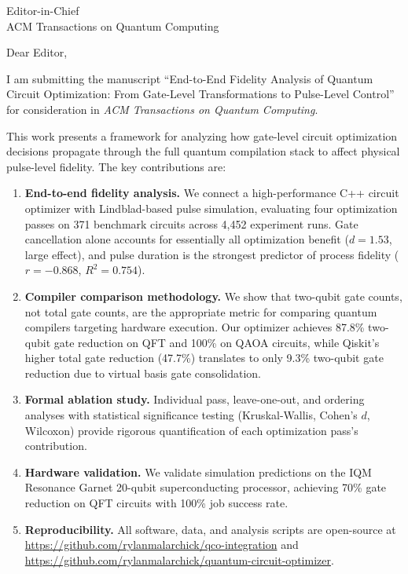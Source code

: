 \documentclass[11pt]{letter}
\begin{document}
\begin{letter}{Editor-in-Chief\\
ACM Transactions on Quantum Computing}

\opening{Dear Editor,}

I am submitting the manuscript ``End-to-End Fidelity Analysis of Quantum Circuit Optimization: From Gate-Level Transformations to Pulse-Level Control'' for consideration in \textit{ACM Transactions on Quantum Computing}.

This work presents a framework for analyzing how gate-level circuit optimization decisions propagate through the full quantum compilation stack to affect physical pulse-level fidelity. The key contributions are:

\begin{enumerate}
    \item \textbf{End-to-end fidelity analysis.} We connect a high-performance C++ circuit optimizer with Lindblad-based pulse simulation, evaluating four optimization passes on 371 benchmark circuits across 4,452 experiment runs. Gate cancellation alone accounts for essentially all optimization benefit ($d = 1.53$, large effect), and pulse duration is the strongest predictor of process fidelity ($r = -0.868$, $R^2 = 0.754$).

    \item \textbf{Compiler comparison methodology.} We show that two-qubit gate counts, not total gate counts, are the appropriate metric for comparing quantum compilers targeting hardware execution. Our optimizer achieves 87.8\% two-qubit gate reduction on QFT and 100\% on QAOA circuits, while Qiskit's higher total gate reduction (47.7\%) translates to only 9.3\% two-qubit gate reduction due to virtual basis gate consolidation.

    \item \textbf{Formal ablation study.} Individual pass, leave-one-out, and ordering analyses with statistical significance testing (Kruskal-Wallis, Cohen's $d$, Wilcoxon) provide rigorous quantification of each optimization pass's contribution.

    \item \textbf{Hardware validation.} We validate simulation predictions on the IQM Resonance Garnet 20-qubit superconducting processor, achieving 70\% gate reduction on QFT circuits with 100\% job success rate.

    \item \textbf{Reproducibility.} All software, data, and analysis scripts are open-source at \url{https://github.com/rylanmalarchick/qco-integration} and \url{https://github.com/rylanmalarchick/quantum-circuit-optimizer}.
\end{enumerate}


\end{letter}
\end{document}
